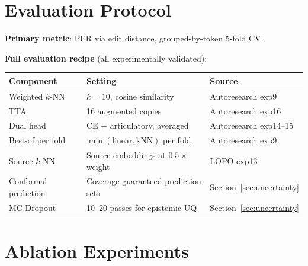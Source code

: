 \documentclass[11pt,letterpaper]{article}
\begin{document}
\section{Evaluation Protocol}

\textbf{Primary metric}: PER via edit distance, grouped-by-token 5-fold CV.

\textbf{Full evaluation recipe} (all experimentally validated):

\begin{table}[h]\centering\small
\begin{tabular}{@{}lll@{}}
\toprule
\textbf{Component} & \textbf{Setting} & \textbf{Source} \\
\midrule
Weighted $k$-NN & $k{=}10$, cosine similarity & Autoresearch exp9 \\
TTA & 16 augmented copies & Autoresearch exp16 \\
Dual head & CE + articulatory, averaged & Autoresearch exp14--15 \\
Best-of per fold & $\min(\text{linear}, \text{kNN})$ per fold & Autoresearch exp9 \\
Source $k$-NN & Source embeddings at $0.5\times$ weight & LOPO exp13 \\
\midrule
Conformal prediction & Coverage-guaranteed prediction sets & Section~\ref{sec:uncertainty} \\
MC Dropout & 10--20 passes for epistemic UQ & Section~\ref{sec:uncertainty} \\
\bottomrule
\end{tabular}
\end{table}


\section{Ablation Experiments}
\end{document}
